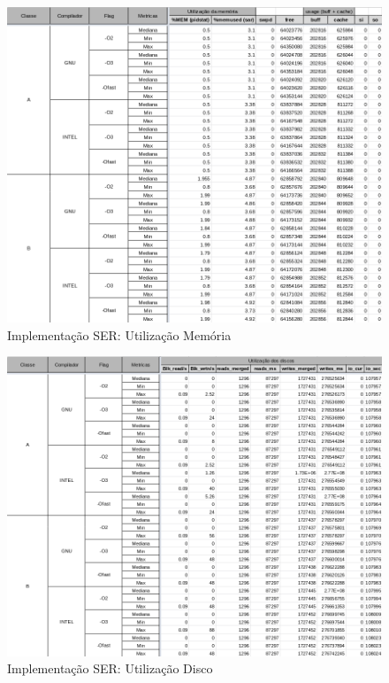 \documentclass{article}
\begin{document}
\begin{appendices}
\begin{figure}[H]
    \centering
    \includegraphics[width=12cm]{Pictures/FT_r641_SER_MEM.png}
    \caption{Implementação SER: Utilização Memória}
    \label{figure:FT_r641_SER_MEM}
\end{figure}

\begin{figure}[H]
    \centering
    \includegraphics[width=12cm]{Pictures/FT_r641_SER_DISK.png}
    \caption{Implementação SER: Utilização Disco}
    \label{figure:FT_r641_SER_DISK}
\end{figure}


\end{appendices}
\end{document}
